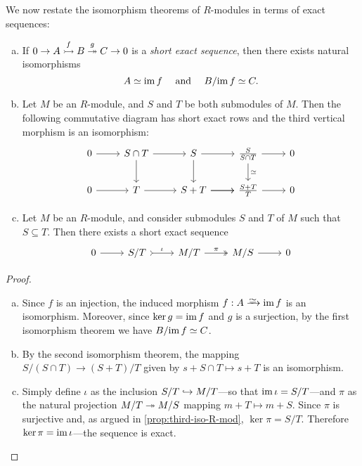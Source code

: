 \begin{proposition}
\label{prop:isomorphism-thms-with-exact-sequences}
We now restate the isomorphism theorems of \(R\)-modules in terms of exact
sequences:
\begin{enumerate}[(a)]\setlength\itemsep{0em}
\item If \(0 \to A \overset{f}{\rightarrowtail} B \overset{g}{\twoheadrightarrow} C \to 0\) is a
  \emph{short exact sequence}, then there exists natural isomorphisms
  \[
  A \simeq \operatorname{im} f \quad\text{ and }\quad B/{\operatorname{im} f} \simeq C.
  \]
\item Let \(M\) be an \(R\)-module, and \(S\) and \(T\) be both submodules of
  \(M\). Then the following commutative diagram has short exact rows and the
  third vertical morphism is an isomorphism:
  \[
  \begin{tikzcd}
  0 \ar[r] &S \cap T \ar[d] \ar[r] &S \ar[r] \ar[d]
  &\frac{S}{S \cap T} \ar[r] \ar[d, "\dis"] &0
  \\
  0 \ar[r] &T \ar[r] &S + T \ar[r] \ar[r] &\frac{S + T}{T} \ar[r] &0
  \end{tikzcd}
  \]
\item Let \(M\) be an \(R\)-module, and consider submodules \(S\) and \(T\) of
  \(M\) such that \(S \subseteq T\). Then there exists a short exact sequence
  \[
  \begin{tikzcd}
  0 \ar[r] &S/T \ar[r, tail, "\iota"] &M/T \ar[r, two heads, "\pi"]
  &M/S \ar[r] &0
  \end{tikzcd}
  \]
\end{enumerate}
\end{proposition}

\begin{proof}
\begin{enumerate}[(a)]\setlength\itemsep{0em}
\item Since \(f\) is an injection, the induced morphism \(f: A \isoto \im f\) is
  an isomorphism. Moreover, since \(\ker g = \operatorname{im} f\) and \(g\) is a surjection,
  by the first isomorphism theorem we have \(B/{\operatorname{im} f} \simeq C\).
\item By the second isomorphism theorem, the mapping
  \(S/(S \cap T) \to (S + T)/T\) given by \(s + S \cap T \mapsto s + T\) is an
  isomorphism.
\item Simply define \(\iota\) as the inclusion \(S/T \hookrightarrow M/T\)---so that
  \(\operatorname{im} \iota = S/T\)---and \(\pi\) as the natural projection \(M/T \twoheadrightarrow M/S\)
  mapping \(m + T \mapsto m + S\). Since \(\pi\) is surjective and, as argued in
  \cref{prop:third-iso-R-mod}, \(\ker \pi = S/T\). Therefore
  \(\ker \pi = \operatorname{im} \iota\)---the sequence is exact.
\end{enumerate}
\end{proof}

